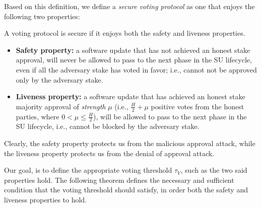 Based on this definition, we define a \emph{secure voting protocol} as one that 
enjoys the following two properties:
\begin{definition}
	A voting protocol is secure if it enjoys both the safety and liveness 
	properties.
	
	\begin{itemize}
		\item \textbf{Safety property:} a software update that has 
		not achieved an honest stake approval, will never be allowed to pass to 
		the 
		next phase in the SU lifecycle, even if all the adversary stake has 
		voted in favor; i.e., cannot not be approved only by the adversary 
		stake.
		\item \textbf{Liveness property:} a software update that has 
		achieved an honest stake majority approval of \emph{strength} $\mu$ 
		(i.e., $\frac{H}{2} + \mu$ positive votes from the honest parties, 
		where $0 <\mu \leq \frac{H}{2}$), will be allowed to pass to the next 
		phase in the SU lifecycle, i.e., cannot be blocked by the adversary 
		stake.
	\end{itemize}
	
\end{definition}


Clearly, the safety property protects us from the malicious approval attack, 
while the liveness property protects us from the denial of approval attack.

Our goal, is to define the appropriate voting threshold $\tau_V$, such as the 
two said properties hold. The following theorem defines the necessary and 
sufficient condition that the voting threshold should satisfy, in order both 
the safety and liveness properties to hold.

